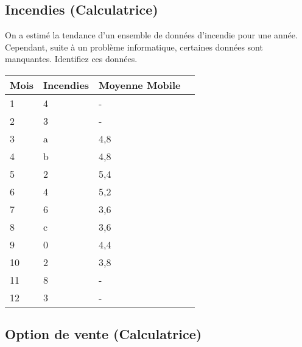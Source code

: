 \documentclass[11pt,english,francais]{article}
\begin{document}
\subsection{Incendies (Calculatrice)}

On a estimé la tendance d’un ensemble de données d’incendie pour une
année. Cependant, suite à un problème informatique, certaines données
sont manquantes. Identifiez ces données.\\

\begin{tabular}{|l|l|l|l|}
  \hline
  \multicolumn{1}{|l|}{Mois} & \multicolumn{1}{l|}{Incendies} & \multicolumn{1}{l|}{Moyenne Mobile} &  \\ \hline
  1 & 4 & \multicolumn{1}{l|}{-} &  \\ \hline
  2 & 3 & \multicolumn{1}{l|}{-} &  \\ \hline
  3 & \multicolumn{1}{l|}{a} & 4,8 &  \\ \hline
  4 & \multicolumn{1}{l|}{b} & 4,8 &  \\ \hline
  5 & 2 & 5,4 &  \\ \hline
  6 & 4 & 5,2 &  \\ \hline
  7 & 6 & 3,6 &  \\ \hline
  8 & \multicolumn{1}{l|}{c} & 3,6 &  \\ \hline
  9 & \multicolumn{1}{l|}{0} & 4,4 &  \\ \hline
  10 & 2 & 3,8 &  \\ \hline
  11 & 8 & \multicolumn{1}{l|}{-} &  \\ \hline
  12 & 3 & \multicolumn{1}{l|}{-} &  \\ \hline
\end{tabular}

\subsection{Option de vente (Calculatrice)}
\end{document}
